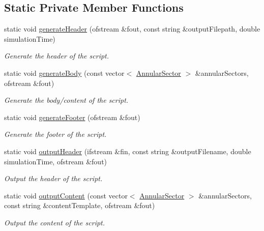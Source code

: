 \subsection*{\-Static \-Private \-Member \-Functions}
\begin{DoxyCompactItemize}
\item 
static void \hyperlink{classmultiscale_1_1video_1_1PolarGnuplotScriptGenerator_abad924831da9046dc757a7508f47ce55}{generate\-Header} (ofstream \&fout, const string \&output\-Filepath, double simulation\-Time)
\begin{DoxyCompactList}\small\item\em \-Generate the header of the script. \end{DoxyCompactList}\item 
static void \hyperlink{classmultiscale_1_1video_1_1PolarGnuplotScriptGenerator_a5386b0f2c6286c709c3084c5101963c6}{generate\-Body} (const vector$<$ \hyperlink{classmultiscale_1_1video_1_1AnnularSector}{\-Annular\-Sector} $>$ \&annular\-Sectors, ofstream \&fout)
\begin{DoxyCompactList}\small\item\em \-Generate the body/content of the script. \end{DoxyCompactList}\item 
static void \hyperlink{classmultiscale_1_1video_1_1PolarGnuplotScriptGenerator_af760c3b80b2d8966d7fbea00b97e3785}{generate\-Footer} (ofstream \&fout)
\begin{DoxyCompactList}\small\item\em \-Generate the footer of the script. \end{DoxyCompactList}\item 
static void \hyperlink{classmultiscale_1_1video_1_1PolarGnuplotScriptGenerator_a9d10aa501cb749ef09a5c3019406ddc1}{output\-Header} (ifstream \&fin, const string \&output\-Filename, double simulation\-Time, ofstream \&fout)
\begin{DoxyCompactList}\small\item\em \-Output the header of the script. \end{DoxyCompactList}\item 
static void \hyperlink{classmultiscale_1_1video_1_1PolarGnuplotScriptGenerator_a5ccc1caca243f48e7cb7bc1083bd07a3}{output\-Content} (const vector$<$ \hyperlink{classmultiscale_1_1video_1_1AnnularSector}{\-Annular\-Sector} $>$ \&annular\-Sectors, const string \&content\-Template, ofstream \&fout)
\begin{DoxyCompactList}\small\item\em \-Output the content of the script. \end{DoxyCompactList}\item 

\end{DoxyCompactItemize}
